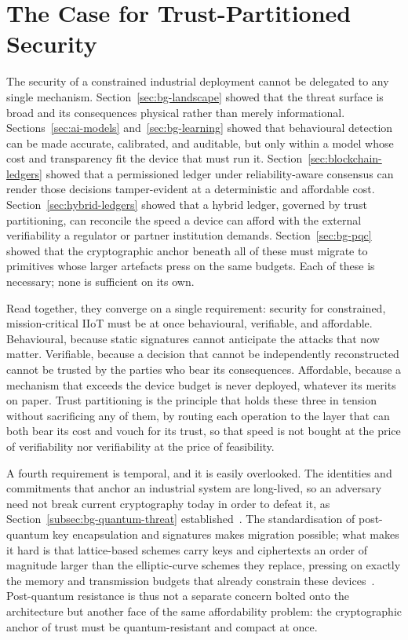 \section{The Case for Trust-Partitioned Security}
\label{sec:case}

The security of a constrained industrial deployment cannot be delegated to any
single mechanism. Section~\ref{sec:bg-landscape} showed that the threat surface
is broad and its consequences physical rather than merely informational.
Sections~\ref{sec:ai-models} and~\ref{sec:bg-learning} showed that behavioural
detection can be made accurate, calibrated, and auditable, but only within a
model whose cost and transparency fit the device that must run it.
Section~\ref{sec:blockchain-ledgers} showed that a permissioned ledger under
reliability-aware consensus can render those decisions tamper-evident at a
deterministic and affordable cost. Section~\ref{sec:hybrid-ledgers} showed that
a hybrid ledger, governed by trust partitioning, can reconcile the speed a device
can afford with the external verifiability a regulator or partner institution
demands. Section~\ref{sec:bg-pqc} showed that the cryptographic anchor beneath
all of these must migrate to primitives whose larger artefacts press on the same
budgets. Each of these is necessary; none is sufficient on its own.

Read together, they converge on a single requirement: security for constrained,
mission-critical IIoT must be at once behavioural, verifiable, and affordable.
Behavioural, because static signatures cannot anticipate the attacks that now
matter. Verifiable, because a decision that cannot be independently
reconstructed cannot be trusted by the parties who bear its consequences.
Affordable, because a mechanism that exceeds the device budget is never
deployed, whatever its merits on paper. Trust partitioning is the principle that
holds these three in tension without sacrificing any of them, by routing each
operation to the layer that can both bear its cost and vouch for its trust, so
that speed is not bought at the price of verifiability nor verifiability at the
price of feasibility.

A fourth requirement is temporal, and it is easily overlooked. The identities
and commitments that anchor an industrial system are long-lived, so an adversary
need not break current cryptography today in order to defeat it, as
Section~\ref{subsec:bg-quantum-threat} established~\cite{singh2024managing}. The
standardisation of post-quantum key encapsulation and signatures makes migration
possible; what makes it hard is that lattice-based schemes carry keys and
ciphertexts an order of magnitude larger than the elliptic-curve schemes they
replace, pressing on exactly the memory and transmission budgets that already
constrain these devices~\cite{castiglione2024integrating}. Post-quantum
resistance is thus not a separate concern bolted onto the architecture but
another face of the same affordability problem: the cryptographic anchor of
trust must be quantum-resistant and compact at once.

